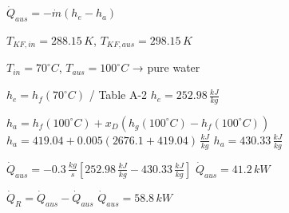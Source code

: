 \( \dot{Q}_{aus} = -\dot{m} (h_e - h_a) \)  

\( T_{KF,in} = 288.15 \, K \), \( T_{KF,aus} = 298.15 \, K \)  

\( T_{in} = 70^\circ C \), \( T_{aus} = 100^\circ C \) → pure water  

\( h_e = h_f(70^\circ C) \) / Table A-2  
\( h_e = 252.98 \, \frac{kJ}{kg} \)  

\( h_a = h_f(100^\circ C) + x_D (h_g(100^\circ C) - h_f(100^\circ C)) \)  
\( h_a = 419.04 + 0.005 (2676.1 + 419.04) \, \frac{kJ}{kg} \)  
\( h_a = 430.33 \, \frac{kJ}{kg} \)  

\( \dot{Q}_{aus} = -0.3 \, \frac{kg}{s} [252.98 \, \frac{kJ}{kg} - 430.33 \, \frac{kJ}{kg}] \)  
\( \dot{Q}_{aus} = 41.2 \, kW \)  

\( \dot{Q}_R = \dot{Q}_{aus} - \dot{Q}_{aus} \)  
\( \dot{Q}_{aus} = 58.8 \, kW \)